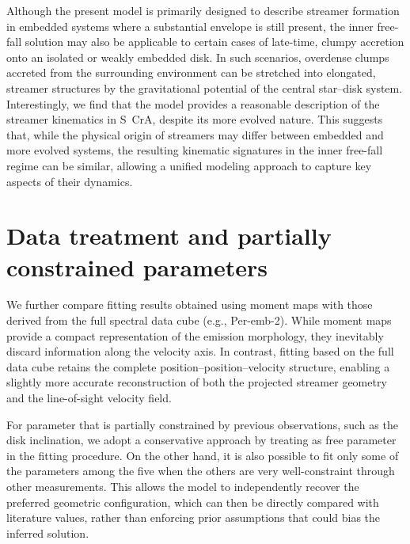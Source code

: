 Although the present model is primarily designed to describe streamer formation in embedded systems where a substantial envelope is still present, the inner free-fall solution may also be applicable to certain cases of late-time, clumpy accretion onto an isolated or weakly embedded disk. In such scenarios, overdense clumps accreted from the surrounding environment can be stretched into elongated, streamer structures by the gravitational potential of the central star--disk system. Interestingly, we find that the model provides a reasonable description of the streamer kinematics in S~CrA, despite its more evolved nature. This suggests that, while the physical origin of streamers may differ between embedded and more evolved systems, the resulting kinematic signatures in the inner free-fall regime can be similar, allowing a unified modeling approach to capture key aspects of their dynamics.

\section{Data treatment and partially constrained parameters}
We further compare fitting results obtained using moment maps with those derived from the full spectral data cube (e.g., Per-emb-2). While moment maps provide a compact representation of the emission morphology, they inevitably discard information along the velocity axis. In contrast, fitting based on the full data cube retains the complete position--position--velocity structure, enabling a slightly more accurate reconstruction of both the projected streamer geometry and the line-of-sight velocity field.

For parameter that is partially constrained by previous observations, such as the disk inclination, we adopt a conservative approach by treating as free parameter in the fitting procedure. On the other hand, it is also possible to fit only some of the parameters among the five when the others are very well-constraint through other measurements. This allows the model to independently recover the preferred geometric configuration, which can then be directly compared with literature values, rather than enforcing prior assumptions that could bias the inferred solution.

